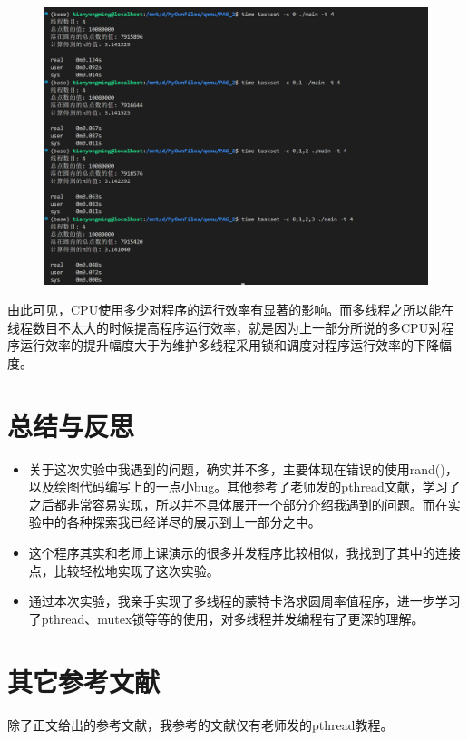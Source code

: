 \documentclass{LabReport}
\begin{document}
\begin{figure}[h!]
	\centering
	\includegraphics[width=0.7\linewidth]{figures/taskset}
	\caption{}
	\label{fig:taskset}
\end{figure}
	
	由此可见，CPU使用多少对程序的运行效率有显著的影响。而多线程之所以能在线程数目不太大的时候提高程序运行效率，就是因为上一部分所说的多CPU对程序运行效率的提升幅度大于为维护多线程采用锁和调度对程序运行效率的下降幅度。
	
	\section{总结与反思}
	\begin{itemize}
		\item 关于这次实验中我遇到的问题，确实并不多，主要体现在错误的使用rand()，以及绘图代码编写上的一点小bug。其他参考了老师发的pthread文献，学习了之后都非常容易实现，所以并不具体展开一个部分介绍我遇到的问题。而在实验中的各种探索我已经详尽的展示到上一部分之中。
		\item 这个程序其实和老师上课演示的很多并发程序比较相似，我找到了其中的连接点，比较轻松地实现了这次实验。
		\item 通过本次实验，我亲手实现了多线程的蒙特卡洛求圆周率值程序，进一步学习了pthread、mutex锁等等的使用，对多线程并发编程有了更深的理解。
	\end{itemize}

	\section{其它参考文献}
	除了正文给出的参考文献，我参考的文献仅有老师发的pthread教程。
	
\end{document}
